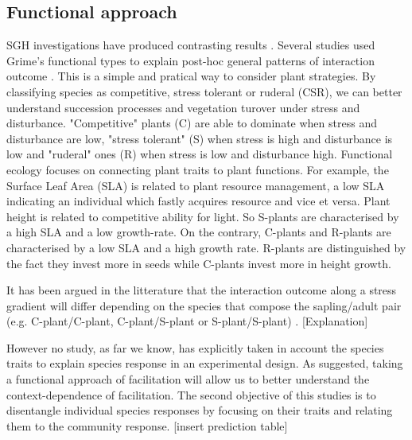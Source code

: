 \documentclass[12pt]{article} %
\begin{document}
\subsection{Functional approach}
SGH investigations have produced contrasting results \citep{Maestre2009}. Several studies used Grime's functional types to explain post-hoc general patterns of interaction outcome \citep{Maestre2009,Butterfield2013}. %
This is a simple and pratical way to consider plant strategies. By classifying species as competitive, stress tolerant or ruderal (CSR), we can better understand succession processes \citep{Raevel2012} and vegetation turover under stress and disturbance. "Competitive" plants (C) are able to dominate when stress and disturbance are low, "stress tolerant" (S) when stress is high and disturbance is low and "ruderal" ones (R) when stress is low and disturbance high.%
 Functional ecology focuses on connecting plant traits to plant functions. For example, the Surface Leaf Area (SLA) is related to plant resource management, a low SLA indicating an individual which fastly acquires resource and vice et versa. Plant height is related to competitive ability for light. So S-plants are characterised by a high SLA and a low growth-rate. On the contrary, C-plants and R-plants are characterised by a low SLA and a high growth rate. R-plants are distinguished by the fact they invest more in seeds while C-plants invest more in height growth.

It has been argued in the litterature that the interaction outcome along a stress gradient will differ depending on the species that compose the sapling/adult pair (e.g. C-plant/C-plant, C-plant/S-plant or S-plant/S-plant) \citep{Maestre2009}. [Explanation]

However no study, as far we know, has explicitly taken in account the species traits to explain species response in an experimental design. As \citet{Butterfield2013} suggested, taking a functional approach of facilitation will allow us to better understand the context-dependence of facilitation. The second objective of this studies is to disentangle individual species responses by focusing on their traits and relating them to the community response. 
[insert prediction table]
\end{document}
